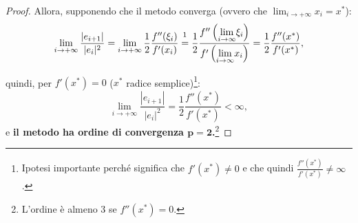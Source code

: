 \begin{proof}
	\noindent Allora, supponendo che il metodo converga (ovvero che $\lim_{i\rightarrow+\infty}x_i=x^*$): 
	\begin{equation*}
		\lim_{i\to + \infty}{\frac{|e_{i+1}|}{|e_i|^2}}=\lim_{i\to + \infty}{\frac{1}{2}\frac{f''(\xi_i)}{f'(x_i)}}\overset{\footnotemark}{=}\frac{1}{2}\frac{f''\left(\underset{i\to\infty}{\lim}\xi_i\right)}{f'\left(\underset{i\to\infty}{\lim}{x_i}\right)}=\frac{1}{2}\frac{f''(x^*)}{f'(x^*)},
	\end{equation*}
	
	
	\noindent quindi, per $f'(x^*)=0$ ($x^*$ radice semplice)\footnote{Ipotesi importante perché significa che $f'(x^*)\neq 0$ e che quindi $\frac{f''(x^*)}{f'(x^*)}\neq\infty$.}:
	\begin{equation*}
		\lim_{i\to + \infty}{\frac{|e_{i+1}|}{|e_i|^2}}=\frac{1}{2}\frac{f''(x^*)}{f'(x^*)}<\infty,
	\end{equation*}
	e \textbf{il metodo ha ordine di convergenza $\boldsymbol{p=2}$.}\footnote{L'ordine è almeno 3 se $f''(x^*)=0$.}
\end{proof}

